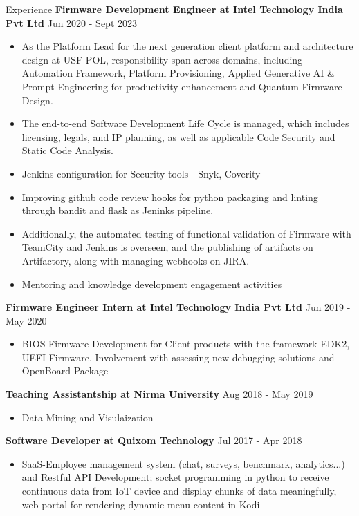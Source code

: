 \documentclass{resume} %
\begin{document}
\begin{rSection}{Experience}
{\textbf{Firmware Development Engineer at Intel Technology India Pvt Ltd}}  \hfill {Jun 2020 - Sept 2023}
\begin{itemize}
    \item As the Platform Lead for the next generation client platform and architecture design at USF POL, responsibility span across domains, including Automation Framework, Platform Provisioning, Applied Generative AI \& Prompt Engineering for productivity enhancement and Quantum Firmware Design.
    \item The end-to-end Software Development Life Cycle is managed, which includes licensing, legals, and IP planning, as well as applicable Code Security and Static Code Analysis.
    \item Jenkins configuration for Security tools - Snyk, Coverity
    \item Improving github code review hooks for python packaging and linting through bandit and flask as Jeninks pipeline.
    \item Additionally, the automated testing of functional validation of Firmware with TeamCity and Jenkins is overseen, and the publishing of artifacts on Artifactory, along with managing webhooks on JIRA.
    \item Mentoring and knowledge development engagement activities
\end{itemize}

{\textbf{Firmware Engineer Intern at Intel Technology India Pvt Ltd}}  \hfill {Jun 2019 - May 2020}
\begin{itemize}
    \item BIOS Firmware Development for Client products with the framework EDK2, UEFI Firmware, Involvement with assessing new debugging solutions and OpenBoard Package
\end{itemize}

{\textbf{Teaching Assistantship at Nirma University}}  \hfill {Aug 2018 - May 2019}
\begin{itemize}
    \item Data Mining and Visulaization
\end{itemize}

{\textbf{Software Developer at Quixom Technology}}   \hfill {Jul 2017 - Apr 2018}
\begin{itemize}
    \item SaaS-Employee management system (chat, surveys, benchmark, analytics...) and Restful API Development; socket programming in python to receive continuous data from IoT device and display chunks of data meaningfully, web portal for rendering dynamic menu content in Kodi
\end{itemize}


\end{rSection}
\end{document}
